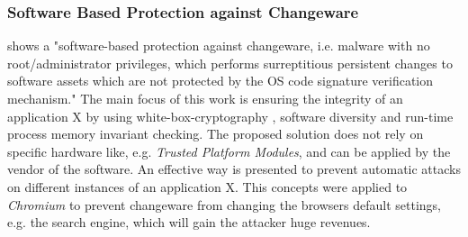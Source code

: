\subsubsection{Software Based Protection against Changeware}
\cite{changeware} shows a "software-based protection against changeware, i.e. malware with no root/administrator privileges, which performs surreptitious persistent changes to software assets which are not protected by the OS code signature verification mechanism." The main focus of this work is ensuring the integrity of an application X by using white-box-cryptography \cite{wbcrypto}, software diversity \cite{Forrest} and run-time process memory invariant checking. The proposed solution does not rely on specific hardware like, e.g. \emph{Trusted Platform Modules}, and can be applied by the vendor of the software. An effective way is presented to prevent automatic attacks on different instances of an application X. This concepts were applied to \emph{Chromium} to prevent changeware from changing the browsers default settings, e.g. the search engine, which will gain the attacker huge revenues. 